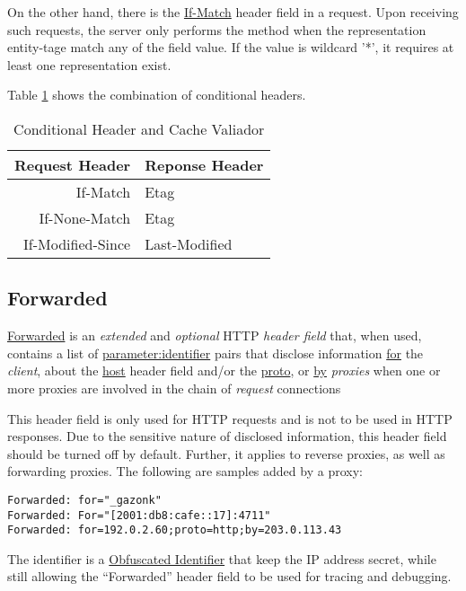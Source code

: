 On the other hand, there is the \uline{If-Match} header field in a
request. Upon receiving such requests, the server only performs
the method when the representation entity-tage match any of the
field value. If the value is wildcard '*', it requires at least
one representation exist.

Table \ref{tab:condi-hed-cache-vld} shows the combination of
conditional headers.

\begin{table}[tbp]
  \centering
  \begin{tabular}[tbp]{r|l}
    \toprule
    Request Header & Reponse Header \\
    \midrule         
    If-Match & Etag \\
    If-None-Match & Etag \\
    If-Modified-Since & Last-Modified \\
    \bottomrule
  \end{tabular}
  \caption{Conditional Header and Cache Valiador}
  \label{tab:condi-hed-cache-vld}
\end{table}

\subsection{Forwarded}
\label{sec:http-forwarded}

\uline{Forwarded} is an \textit{extended} and \textit{optional}
HTTP \textit{header field} that, when used, contains a list of
\uline{parameter:identifier} pairs that disclose information
\uline{for} the \textit{client}, about the \uline{host} header
field and/or the \uline{proto}, or \uline{by} \textit{proxies}
when one or more proxies are involved in the chain of
\textit{request} connections

This header field is only used for HTTP requests and is not to be
used in HTTP responses. Due to the sensitive nature of disclosed
information, this header field should be turned off by
default. Further, it applies to reverse proxies, as well as
forwarding proxies. The following are samples added by a proxy:

\begin{lstlisting}
Forwarded: for="_gazonk"
Forwarded: For="[2001:db8:cafe::17]:4711"
Forwarded: for=192.0.2.60;proto=http;by=203.0.113.43
\end{lstlisting}

The identifier is a
\href{https://tools.ietf.org/html/rfc7239#section-6.3}{Obfuscated
  Identifier} that keep the IP address secret, while still
allowing the ``Forwarded'' header field to be used for tracing and
debugging.

